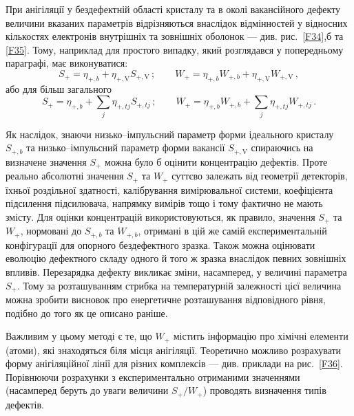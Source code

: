 \documentclass[10pt,a5paper,titlepage,oneside]{book}
\numberwithin{equation}{part}
\begin{document}
При анігіляції у бездефектній області кристалу та в околі вакансійного дефекту
величини вказаних параметрів
відрізняються внаслідок відмінностей у відносних кількостях електронів внутрішніх
та зовнішніх оболонок --- див. рис.~\ref{F34},б та \ref{F35}.
Тому, наприклад для простого випадку, який розглядався у попередньому параграфі,
має виконуватися:
\begin{equation*}
S_+=\eta_{+,b}+\eta_{+,\mathrm{V}}S_{+,\mathrm{V}}\,;\qquad
W_+=\eta_{+,b}W_{+,b}+\eta_{+,\mathrm{V}}W_{+,\mathrm{V}}\,,
\end{equation*}
або для більш загального
\begin{equation*}
S_+=\eta_{+,b}+\sum_j\eta_{+,tj}S_{+,tj}\,;\qquad
W_+=\eta_{+,b}W_{+,b}+\sum_j\eta_{+,tj}W_{+,tj}\,.
\end{equation*}

Як наслідок, знаючи низько--імпульсний параметр форми ідеального кристалу $S_{+,b}$
та низько--імпульсний параметр форми вакансії $S_{+,\mathrm{V}}$
спираючись на визначене значення $S_+$ можна було б оцінити
концентрацію дефектів.
Проте реально абсолютні значення $S_+$ та $W_+$ суттєво залежать
від геометрії детекторів, їхньої роздільної здатності, калібрування
вимірювальної системи, коефіцієнта підсилення підсилювача,
напрямку вимірів тощо і тому фактично не мають змісту.
Для оцінки концентрацій використовуються, як правило,
значення $S_+$ та $W_+$, нормовані до $S_{+,b}$ та $W_{+,b}$,
отримані в цій же самій експериментальній  конфігурації
для опорного бездефектного зразка.
Також можна оцінювати еволюцію дефектного складу одного й того ж зразка внаслідок
певних зовнішніх впливів.
Перезарядка дефекту викликає зміни, насамперед, у величині параметра $S_+$.
Тому за розташуванням стрибка на температурній залежності
цієї величина можна зробити висновок
про енергетичне розташування відповідного рівня,
подібно до того як це описано раніше.



Важливим у цьому методі є те, що $W_+$ містить
інформацію про хімічні елементи (атоми), які знаходяться біля місця анігіляції.
Теоретично можливо розрахувати форму анігіляційної лінії для
різних комплексів --- див. приклади на рис.~\ref{F36}.
Порівнюючи розрахунки з експериментально отриманими значеннями
(насамперед беруть до уваги величини $S_+/W_+$) проводять
визначення типів дефектів.
\end{document}
